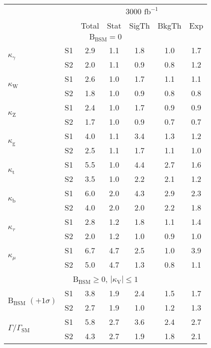 \begin{tabular}{@{} l c c@{\hskip 0.15in} c c c c @{}}
 \hline
  &  & \multicolumn{5}{c}{3000 $\text{fb}^{-1}$} \\
  &  & Total & Stat & SigTh & BkgTh & Exp \\
  \hline
  \multicolumn{7}{c}{$\mathrm{B}_{\mathrm{BSM}} = 0$}\\
 \hline
\multirow{2}{*}{$\kappa_{\gamma }$} & S1  & 2.9& 1.1 & 1.8 & 1.0 & 1.7  \\[1pt]
                        & S2  & 2.0& 1.1 & 0.9 & 0.8 & 1.2  \\[4pt]
\multirow{2}{*}{$\kappa_{\mathrm{W}}$} & S1  & 2.6& 1.0 & 1.7 & 1.1 & 1.1  \\[1pt]
                        & S2  & 1.8& 1.0 & 0.9 & 0.8 & 0.8  \\[4pt]
\multirow{2}{*}{$\kappa_{\mathrm{Z}}$} & S1  & 2.4& 1.0 & 1.7 & 0.9 & 0.9  \\[1pt]
                        & S2  & 1.7& 1.0 & 0.9 & 0.7 & 0.7  \\[4pt]
\multirow{2}{*}{$\kappa_{\mathrm{g}}$} & S1  & 4.0& 1.1 & 3.4 & 1.3 & 1.2  \\[1pt]
                        & S2  & 2.5& 1.1 & 1.7 & 1.1 & 1.0  \\[4pt]
\multirow{2}{*}{$\kappa_{\mathrm{t}}$} & S1  & 5.5& 1.0 & 4.4 & 2.7 & 1.6  \\[1pt]
                        & S2  & 3.5& 1.0 & 2.2 & 2.1 & 1.2  \\[4pt]
\multirow{2}{*}{$\kappa_{\mathrm{b}}$} & S1  & 6.0& 2.0 & 4.3 & 2.9 & 2.3  \\[1pt]
                        & S2  & 4.0& 2.0 & 2.0 & 2.2 & 1.8  \\[4pt]
\multirow{2}{*}{$\kappa_{\tau }$} & S1  & 2.8& 1.2 & 1.8 & 1.1 & 1.4  \\[1pt]
                        & S2  & 2.0& 1.2 & 1.0 & 0.9 & 1.0  \\[4pt]
\multirow{2}{*}{$\kappa_{\mu}$} & S1  & 6.7& 4.7 & 2.5 & 1.0 & 3.9  \\[1pt]
                        & S2  & 5.0& 4.7 & 1.3 & 0.8 & 1.1  \\[4pt]
\hline
\multicolumn{7}{c}{$\mathrm{B}_{\mathrm{BSM}} \geq 0$, $|\kappa_{\mathrm{V}}| \leq 1$}\\
\hline
\multirow{2}{*}{$\mathrm{B}_{\mathrm{BSM}}$ \tiny{$(+1\sigma)$}} & S1  & 3.8& 1.9 & 2.4 & 1.5 & 1.7  \\[1pt]
                        & S2  & 2.7& 1.9 & 1.0 & 1.2 & 1.3  \\[4pt]
\multirow{2}{*}{$\Gamma/\Gamma_{\mathrm{SM}}$} & S1  & 5.8& 2.7 & 3.6 & 2.4 & 2.7  \\[1pt]
                        & S2  & 4.3& 2.7 & 1.9 & 1.8 & 2.1  \\[4pt]
\hline
\end{tabular}